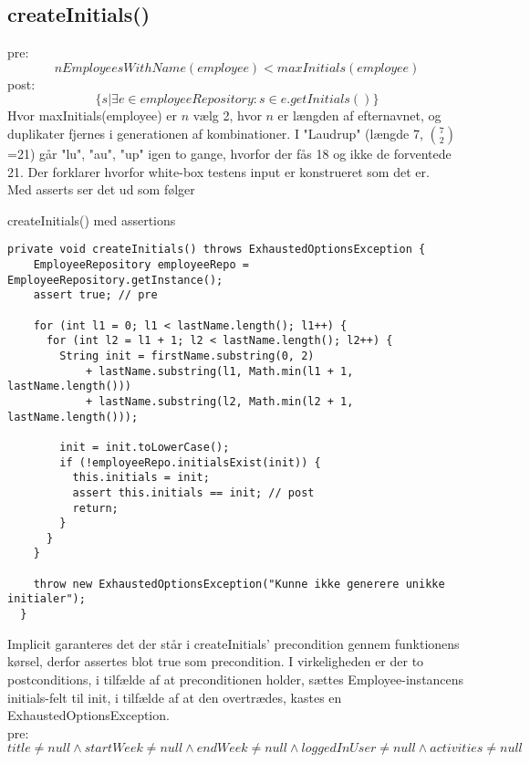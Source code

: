 \subsection{createInitials()} \label{sec:contract_create_initials}
pre:
\begin{equation}
    nEmployeesWithName(employee) < maxInitials(employee)
\end{equation}
post:
\begin{equation}
    \{s | \exists e \in employeeRepository : s \in e.getInitials()\}
\end{equation}
Hvor maxInitials(employee) er $n$ vælg 2, hvor $n$ er længden af efternavnet, og duplikater fjernes i generationen af kombinationer.
I "Laudrup" (længde 7, $7 \choose 2$=21) går "lu", "au", "up" igen to gange, hvorfor der fås 18 og ikke de forventede 21. Der forklarer hvorfor white-box testens input er konstrueret som det er.\\[4mm]
Med asserts ser det ud som følger

\begin{listing}[H]
    \centering
    \caption{createInitials() med assertions}\label{lst:create_initials_assertions}
    \begin{verbatim}
private void createInitials() throws ExhaustedOptionsException {
    EmployeeRepository employeeRepo = EmployeeRepository.getInstance();
    assert true; // pre

    for (int l1 = 0; l1 < lastName.length(); l1++) {
      for (int l2 = l1 + 1; l2 < lastName.length(); l2++) {
        String init = firstName.substring(0, 2)
            + lastName.substring(l1, Math.min(l1 + 1, lastName.length()))
            + lastName.substring(l2, Math.min(l2 + 1, lastName.length()));

        init = init.toLowerCase();
        if (!employeeRepo.initialsExist(init)) {
          this.initials = init;
          assert this.initials == init; // post
          return;
        }
      }
    }

    throw new ExhaustedOptionsException("Kunne ikke generere unikke initialer");
  }
    \end{verbatim}
\end{listing}
\noindent
Implicit garanteres det der står i createInitials' precondition gennem funktionens kørsel, derfor assertes blot true som precondition. I virkeligheden er der to postconditions, i tilfælde af at preconditionen holder, sættes Employee-instancens initials-felt til init, i tilfælde af at den overtrædes, kastes en ExhaustedOptionsException.\\[4mm]
pre: 
\begin{equation}
    title \neq null \wedge startWeek \neq null \wedge endWeek \neq null \wedge loggedInUser \neq null \wedge activities \neq null
\end{equation}

